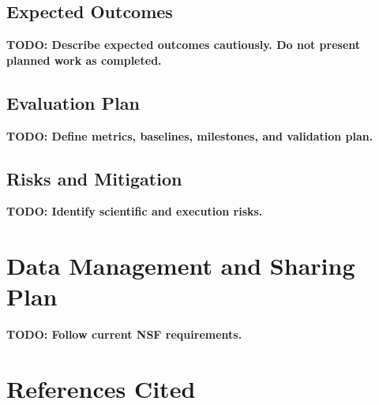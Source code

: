 \documentclass[11pt]{article}
\newcommand{\todo}[1]{\textbf{TODO: #1}}
\begin{document}
\subsection{Expected Outcomes}
\todo{Describe expected outcomes cautiously. Do not present planned work as completed.}

\subsection{Evaluation Plan}
\todo{Define metrics, baselines, milestones, and validation plan.}

\subsection{Risks and Mitigation}
\todo{Identify scientific and execution risks.}

\section{Data Management and Sharing Plan}
\todo{Follow current NSF requirements.}

\section{References Cited}
\end{document}
